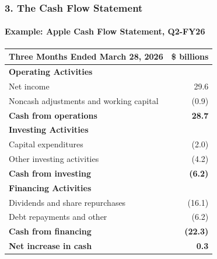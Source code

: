 \documentclass{beamer}
\begin{document}
\begin{frame}[t]
    \frametitle{3. The Cash Flow Statement}
    \framesubtitle{Example: Apple Cash Flow Statement, Q2-FY26}

    \begin{table}
        \centering
        \footnotesize
        \begin{tabular}{lr}
            \toprule
            \textbf{Three Months Ended March 28, 2026}
                & \textbf{\$ billions} \\
            \midrule
            \textbf{Operating Activities} & \\
            Net income & 29.6 \\
            Noncash adjustments and working capital & (0.9) \\
            \textbf{Cash from operations} & \textbf{28.7} \\
            \midrule
            \textbf{Investing Activities} & \\
            Capital expenditures & (2.0) \\
            Other investing activities & (4.2) \\
            \textbf{Cash from investing} & \textbf{(6.2)} \\
            \midrule
            \textbf{Financing Activities} & \\
            Dividends and share repurchases & (16.1) \\
            Debt repayments and other & (6.2) \\
            \textbf{Cash from financing} & \textbf{(22.3)} \\
            \midrule
            \textbf{Net increase in cash} & \textbf{0.3} \\
            \bottomrule
        \end{tabular}
    \end{table}


\end{frame}
\end{document}
